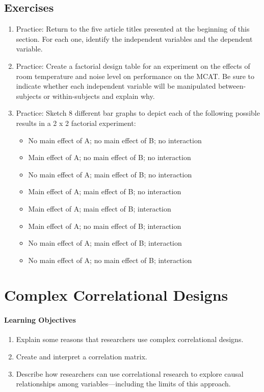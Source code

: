 \subsection{Exercises}
\begin{fullwidth}
\begin{enumerate}
\item  Practice: Return to the five article titles presented at the beginning of this section. For each one, identify the independent variables and the dependent variable.
\item Practice: Create a factorial design table for an experiment on the effects of room temperature and noise level on performance on the MCAT. Be sure to indicate whether each independent variable will be manipulated between-subjects or within-subjects and explain why.
\item Practice: Sketch 8 different bar graphs to depict each of the following possible results in a 2 x 2 factorial experiment:
\begin{itemize}
\item No main effect of A; no main effect of B; no interaction
\item Main effect of A; no main effect of B; no interaction
\item No main effect of A; main effect of B; no interaction
\item Main effect of A; main effect of B; no interaction
\item Main effect of A; main effect of B; interaction
\item Main effect of A; no main effect of B; interaction
\item No main effect of A; main effect of B; interaction
\item No main effect of A; no main effect of B; interaction
\end{itemize}
\end{enumerate}
\end{fullwidth}

\newpage



\section{Complex Correlational Designs}

\paragraph{Learning Objectives}
  \begin{enumerate}
  \item Explain some reasons that researchers use complex correlational designs.
  \item Create and interpret a correlation matrix.
  \item  Describe how researchers can use correlational research to explore causal relationships among variables---including the limits of this approach.
   \end{enumerate}



